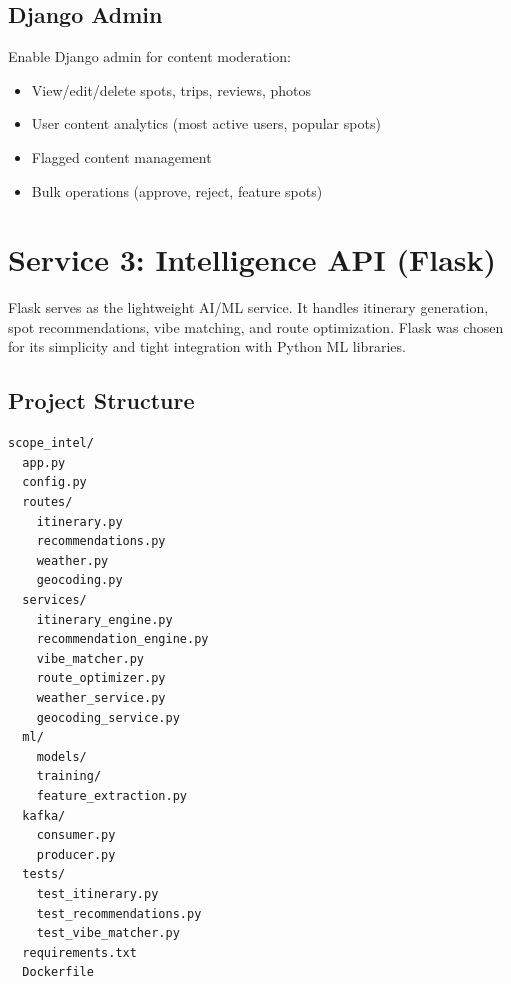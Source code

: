 \documentclass[12pt,letterpaper]{article}
\begin{document}
\subsection{Django Admin}
Enable Django admin for content moderation:
\begin{itemize}
  \item View/edit/delete spots, trips, reviews, photos
  \item User content analytics (most active users, popular spots)
  \item Flagged content management
  \item Bulk operations (approve, reject, feature spots)
\end{itemize}

\newpage

\section{Service 3: Intelligence API (Flask)}

Flask serves as the lightweight AI/ML service. It handles itinerary generation, spot recommendations, vibe matching, and route optimization. Flask was chosen for its simplicity and tight integration with Python ML libraries.

\subsection{Project Structure}
\begin{lstlisting}[style=code]
scope_intel/
  app.py
  config.py
  routes/
    itinerary.py
    recommendations.py
    weather.py
    geocoding.py
  services/
    itinerary_engine.py
    recommendation_engine.py
    vibe_matcher.py
    route_optimizer.py
    weather_service.py
    geocoding_service.py
  ml/
    models/
    training/
    feature_extraction.py
  kafka/
    consumer.py
    producer.py
  tests/
    test_itinerary.py
    test_recommendations.py
    test_vibe_matcher.py
  requirements.txt
  Dockerfile
\end{lstlisting}
\end{document}

